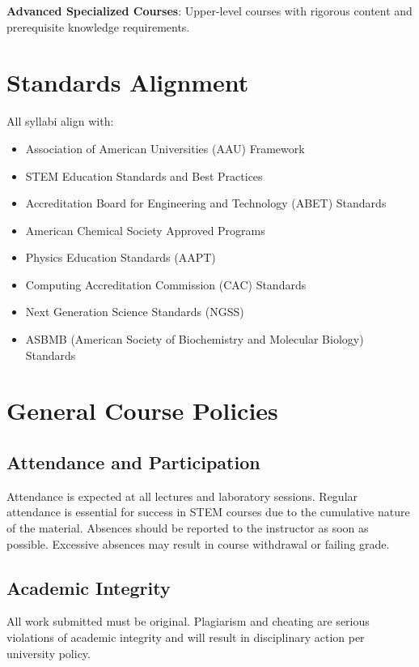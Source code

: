 \documentclass[12pt,oneside]{book}
\begin{document}
\textbf{Advanced Specialized Courses}: Upper-level courses with rigorous content and prerequisite knowledge requirements.

\section*{Standards Alignment}

All syllabi align with:
\begin{itemize}
    \item Association of American Universities (AAU) Framework
    \item STEM Education Standards and Best Practices
    \item Accreditation Board for Engineering and Technology (ABET) Standards
    \item American Chemical Society Approved Programs
    \item Physics Education Standards (AAPT)
    \item Computing Accreditation Commission (CAC) Standards
    \item Next Generation Science Standards (NGSS)
    \item ASBMB (American Society of Biochemistry and Molecular Biology) Standards
\end{itemize}

\section*{General Course Policies}

\subsection*{Attendance and Participation}

Attendance is expected at all lectures and laboratory sessions. Regular attendance is essential for success in STEM courses due to the cumulative nature of the material. Absences should be reported to the instructor as soon as possible. Excessive absences may result in course withdrawal or failing grade.

\subsection*{Academic Integrity}

All work submitted must be original. Plagiarism and cheating are serious violations of academic integrity and will result in disciplinary action per university policy.
\end{document}
